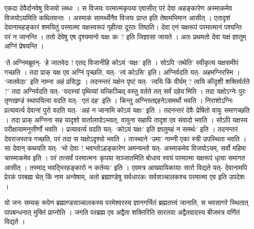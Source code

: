\documentclass[11pt, a5paper]{article}
\begin{document}
एकदा देवैर्दानवेषु विजयो लब्धः । स विजयः परमात्मकृपया एवासीत् परं देवा अहङ्कारेण अस्माकमेव विजयोऽयमिति कथितवन्तः । अस्माकं सामर्थ्येनैव विजयः प्राप्त इति तेषामभिमान आसीत् । एतादृशं देवानामहङ्कारं शमयितुं परमात्मा यक्षस्वरूपं गृहीत्वा दूरतः तिष्ठति। देवा एनं यक्षरूपं परमात्मानं पश्यन्ति परं न जानन्ति । ततो देवेषु एष दृश्यमानो यक्षः कः ? इति जिज्ञासा जायते । अतः प्रथमतो देवा यक्षं ज्ञातुम् अग्निं प्रेषयन्ति ।

‘ते अग्निमब्रूवन्-  ‘हे जातवेदः ! एतद् विजानीहि कोऽयं ‘यक्षः’ इति । सोऽपि ‘तथेति’ स्वीकृत्य यक्षसमीपं गच्छति । तदा प्राक् यक्ष एव अग्निं पृच्छति, यत्- ‘त्वं कोऽसि’ इति। अग्निर्वदति यत्- अहमग्निरस्मि । ‘जातवेदाः’ इति नाम्ना अहं प्रसिद्धः । तदनन्तरं यक्षेन पृष्टं यत्- ‘त्वयि किं वीर्यम् ? त्वयि कीदृशी शक्तिर्वर्तते ?’ तदा अग्निर्वदति यत्- ‘यदस्यां पृथिव्यां यत्किञ्चिद् वस्तु वर्तते तत् सर्वं दहेय’मिति । तदा यक्षोऽग्नेः पुरः तृणखण्डं स्थापयित्वा वदति यत्- ‘एतं दह’ इति । किन्तु अग्निस्तद्दहनेऽसमर्थो भवति । निराशोऽग्निः प्रत्यावर्त्य देवानां पुरो वदति यत्- ‘अहं न जानामि कोऽयं यक्षः’ इति । तदनन्तरं देवैः प्रेषितो वायुः समागच्छति । तदा प्राक् अग्निना सह यादृशो वार्तालापोऽभवत्, वायुना सहापि तादृश एव संवादो भवति । सोऽपि यक्षस्य परीक्षायामनुत्तीर्णो भवति । प्रत्यावर्त्य वदति यत्- ‘कोऽयं यक्षः’ इति ज्ञातुमहं न समर्थः’ इति । तदनन्तरं देवराजस्तत्र गच्छति, परं तदा स यक्षोऽदृश्यो भवति । तत्स्थाने ‘उमा’ नाम्नी एका स्त्री उपस्थिता भवति । सा देवान् कथयति यत्- ‘भो देवाः ! भवन्तोऽहङ्कारेण अमन्यन्तो यत्- अस्माकमेव विजयोऽयम्, सर्वो महिमा चास्माकमेव इति । परं तत्सर्वं परमात्मनः कृपया सञ्जातमिति बोधाय स्वयं परमात्मा यक्षरूपं धृत्वा समागत आसीत् । तस्माद् भवद्भिरहङ्कारो न कर्तव्यः’ इति । एवमत्र आख्यायिकायाः सारो विद्यते यत्- देवानामपि प्रेरकं परबह्म चेत् किं नाम अन्येषाम्, अतो  ब्रह्माण्डेषु सर्वधारकः सर्वसञ्चालकश्च परमात्मा एव इति उपदेशः ।

यो जनः सम्यक् रूपेण ब्रह्माण्डसञ्चालकस्य परमेश्वरस्य ज्ञानगर्भितं ब्रह्मतत्त्वं जानाति, स भवसागरे स्थितात् पापबन्धनात् मुक्तिं प्राप्नोति । जगति परब्रह्म एव अद्वैता शक्तिरिति सारतया अद्वैतवादस्य बीजमत्र वर्णितं विद्यते ।

\section{}

\section{}

\section{}
\end{document}
